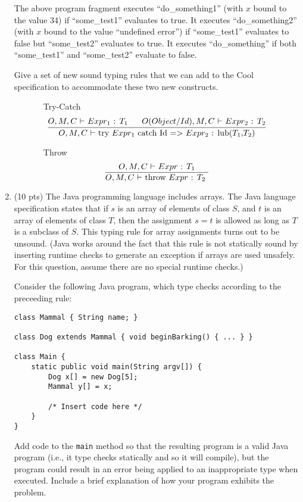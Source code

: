 \documentclass[10pt]{article}
\newcommand{\infertext}[2]{\infer{{\textrm{#1}}}{#2}}
\begin{document}
\begin{enumerate}
The above program fragment executes
  ``do\_something1'' (with $x$ bound to the value 34) if ``some\_test1''
  evaluates to \textsf{true}. It executes ``do\_something2'' (with $x$ bound to the
  value ``undefined error'') if ``some\_test1'' evaluates to \textsf{false} but
  ``some\_test2'' evaluates to \textsf{true}. It executes ``do\_something'' if both
  ``some\_test1'' and ``some\_test2'' evaluate to \textsf{false}.


Give a set of new sound typing rules that we can add to the Cool specification
to accommodate these two new constructs.


\
\ \ \ \ \ \ Try-Catch
\[\infertext
      {$O,M,C$ $\vdash$ try $Expr_1$ catch Id $=>$ $Expr_2$ : lub($T_1$,$T_2$)}
      {\textrm{$O,M,C$ $\vdash$ $Expr_1$ : $T_1$\ \ \ \ \ $O(Object/Id),M,C$ $\vdash$ $Expr_2$ : $T_2$}
      }
    \]

\
\ \ \ \ \ \ Throw
\[\infertext
      {$O,M,C$ $\vdash$ throw $Expr$ : $T_2$ }
      {\textrm{$O,M,C$ $\vdash$ $Expr$ : $T_1$}
      }
    \]





\medskip
\item (10 pts) The Java programming language includes arrays.  The Java
language specification states that if $s$ is an array of elements of
class $S$, and $t$ is an array of elements of class $T$, then the
assignment $s = t$ is allowed as long as $T$ is a subclass of $S$.
This typing rule for array assignments turns out to be unsound. (Java
works around the fact that this rule is not statically sound by inserting
runtime checks to generate an exception if arrays are used
unsafely. For this question, assume there are no special runtime checks.)

Consider the following Java program, which type checks according
to the preceeding rule:
\begin{verbatim}
class Mammal { String name; }

class Dog extends Mammal { void beginBarking() { ... } }

class Main {
    static public void main(String argv[]) {
        Dog x[] = new Dog[5];
        Mammal y[] = x;

        /* Insert code here */
    }
}
\end{verbatim}
Add code to the \texttt{main} method so that the resulting program is
a valid Java program (i.e., it type checks statically and so it will
compile), but the program could result in an error being applied
to an inappropriate type when executed.  Include a brief explanation
of how your program exhibits the problem.
\


\end{enumerate}
\end{document}
